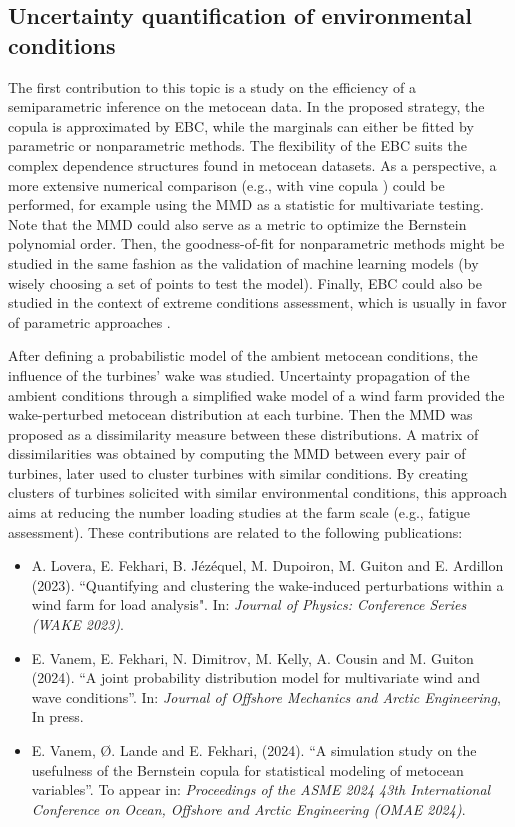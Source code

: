 \subsection*{Uncertainty quantification of environmental conditions}
The first contribution to this topic is a study on the efficiency of a semiparametric inference on the metocean data. 
In the proposed strategy, the copula is approximated by EBC, while the marginals can either be fitted by parametric or nonparametric methods.   
The flexibility of the EBC suits the complex dependence structures found in metocean datasets. 
As a perspective, a more extensive numerical comparison (e.g., with vine copula \citealp{vanem_2016,lin_2019_cvines_waves}) could be performed, for example using the MMD as a statistic for multivariate testing. 
Note that the MMD could also serve as a metric to optimize the Bernstein polynomial order. 
Then, the goodness-of-fit for nonparametric methods might be studied in the same fashion as the validation of machine learning models (by wisely choosing a set of points to test the model).
Finally, EBC could also be studied in the context of extreme conditions assessment, which is usually in favor of parametric approaches \citep{vanem_fekhari_2024}. 

After defining a probabilistic model of the ambient metocean conditions, the influence of the turbines' wake was studied. 
Uncertainty propagation of the ambient conditions through a simplified wake model of a wind farm provided the wake-perturbed metocean distribution at each turbine.  
Then the MMD was proposed as a dissimilarity measure between these distributions. 
A matrix of dissimilarities was obtained by computing the MMD between every pair of turbines, later used to cluster turbines with similar conditions.  
By creating clusters of turbines solicited with similar environmental conditions, this approach aims at reducing the number loading studies at the farm scale (e.g., fatigue assessment).
These contributions are related to the following publications:
\begin{itemize}
    \footnotesize
    \item[\ding{125}] A. Lovera, E. Fekhari, B. Jézéquel, M. Dupoiron, M. Guiton and E. Ardillon (2023). ``Quantifying and clustering the wake-induced perturbations within a wind farm for load analysis". In: \textit{Journal of Physics: Conference Series (WAKE 2023)}.
    \item[\ding{125}] E. Vanem, E. Fekhari, N. Dimitrov, M. Kelly, A. Cousin and M. Guiton (2024). ``A joint probability distribution model for multivariate wind and wave conditions''. In: \textit{Journal of Offshore Mechanics and Arctic Engineering}, In press. 
    \item[\ding{125}] E. Vanem, \O{}. Lande and E. Fekhari, (2024). ``A simulation study on the usefulness of the Bernstein copula for statistical modeling of metocean variables''. To appear in: \textit{Proceedings of the ASME 2024 43th International Conference on Ocean, Offshore and Arctic Engineering (OMAE 2024)}.
\end{itemize}

